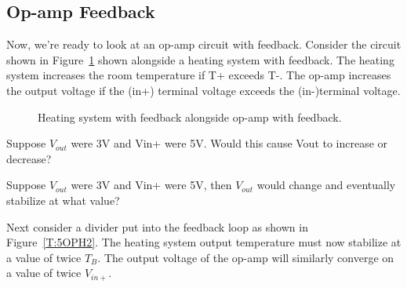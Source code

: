\subsection{Op-amp Feedback}
Now, we're ready to look at an op-amp circuit with feedback. Consider the circuit shown in Figure~\ref{T:5OPH} shown alongside a heating system with feedback. The heating system increases the room temperature if T+ exceeds T-. The op-amp increases the output voltage if the (in+) terminal voltage exceeds the (in-)terminal voltage.
\begin{figure}[H]
\begin{center}
\caption{Heating system with feedback alongside op-amp with feedback.}
\label{T:5OPH}
\end{center}
\end{figure}

\begin{alevel}
Suppose $V_{out}$ were 3V and Vin+ were 5V. Would this cause Vout to increase or decrease?
\end{alevel}
\begin{blevel}
Suppose $V_{out}$ were 3V and Vin+ were 5V, then $V_{out}$ would change and eventually stabilize at what value?
\end{blevel}

Next consider a divider put into the feedback loop as shown in Figure~\ref{T:5OPH2}. The heating system output temperature must now stabilize at a value of twice $T_B$. The output voltage of the op-amp will similarly converge on a value of twice $V_{in+}$.

